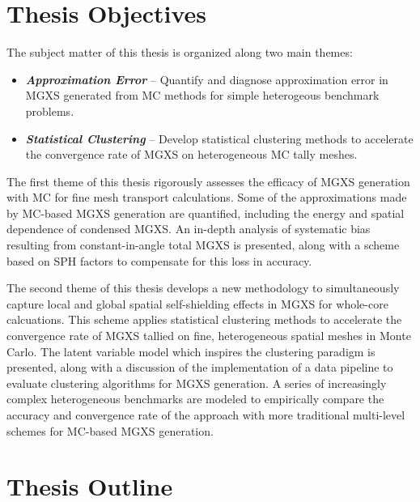 \section{Thesis Objectives}
\label{sec:chap1-objectives}

The subject matter of this thesis is organized along two main themes:

\begin{itemize}
\item \textbf{\textit{Approximation Error}} -- Quantify and diagnose approximation error in \ac{MGXS} generated from \ac{MC} methods for simple heterogeous benchmark problems.
\item \textbf{\textit{Statistical Clustering}} -- Develop statistical clustering methods to accelerate the convergence rate of \ac{MGXS} on heterogeneous \ac{MC} tally meshes.
\end{itemize}

The first theme of this thesis rigorously assesses the efficacy of \ac{MGXS} generation with \ac{MC} for fine mesh transport calculations. Some of the approximations made by \ac{MC}-based \ac{MGXS} generation are quantified, including the energy and spatial dependence of condensed \ac{MGXS}. An in-depth analysis of systematic bias resulting from constant-in-angle total \ac{MGXS} is presented, along with a scheme based on \ac{SPH} factors to compensate for this loss in accuracy. 

The second theme of this thesis develops a new methodology to simultaneously capture local and global spatial self-shielding effects in \ac{MGXS} for whole-core calcuations. This scheme applies statistical clustering methods to accelerate the convergence rate of \ac{MGXS} tallied on fine, heterogeneous spatial meshes in Monte Carlo. The latent variable model which inspires the clustering paradigm is presented, along with a discussion of the implementation of a data pipeline to evaluate clustering algorithms for \ac{MGXS} generation. A series of increasingly complex heterogeneous benchmarks are modeled to empirically compare the accuracy and convergence rate of the approach with more traditional multi-level schemes for \ac{MC}-based MGXS generation.


\section{Thesis Outline}
\label{sec:chap1-outline}

